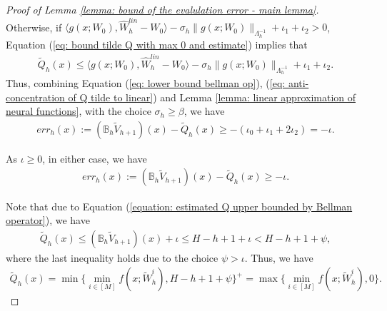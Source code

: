 \documentclass{article} \usepackage{iclr2023/iclr2023_conference,times}
\begin{document}
\begin{proof}[Proof of Lemma \ref{lemma: bound of the evalulation error - main lemma}]
Otherwise, if $\langle g(x; W_0), \hat{W}_h^{lin} - W_0 \rangle  -\sigma_h \| g(x; W_0) \|_{\Lambda_h^{-1}} + \iota_1 + \iota_2 > 0$, 
Equation (\ref{eq: bound tilde Q with max 0 and estimate}) implies that
\begin{align}
   \tilde{Q}_h(x) \leq \langle g(x; W_0), \hat{W}_h^{lin} - W_0 \rangle  -\sigma_h \| g(x; W_0) \|_{\Lambda_h^{-1}} + \iota_1 + \iota_2.
   \label{eq: anti-concentration of Q tilde to linear}
\end{align}
Thus, combining Equation (\ref{eq: lower bound bellman op}), (\ref{eq: anti-concentration of Q tilde to linear})
and Lemma \ref{lemma: linear approximation of neural functions}, with the choice $\sigma_h \geq \beta$, we have
\begin{align*}
err_h(x) := (\mathbb{B}_h \tilde{V}_{h+1})(x) -\tilde{Q}_h(x) \geq  -(\iota_0 + \iota_1 + 2 \iota_2 ) = -\iota.
\end{align*}

As $\iota \geq 0$, in either case, we have 
\begin{align}
err_h(x) := (\mathbb{B}_h \tilde{V}_{h+1})(x) -\tilde{Q}_h(x) \geq -\iota.
   \label{equation: estimated Q upper bounded by Bellman operator}
\end{align}

Note that due to Equation (\ref{equation: estimated Q upper bounded by Bellman operator}), we have
\begin{align*}
    \tilde{Q}_h(x) \leq (\mathbb{B}_h \tilde{V}_{h+1})(x)  + \iota \leq H - h + 1 + \iota < H - h + 1 + \psi,
\end{align*}
where the last inequality holds due to the choice $\psi > \iota$. Thus, we have 
\begin{align}
    \tilde{Q}_h(x) =  \min\{ \min_{i \in [M]}  f(x; \tilde{W}^i_h), H-h+1 + \psi \}^+ = \max\{ \min_{i \in [M]}  f(x; \tilde{W}^i_h), 0 \}. 
    \label{eq: simplify the bellman target by removing the max value}
\end{align}


\end{proof}
\end{document}

